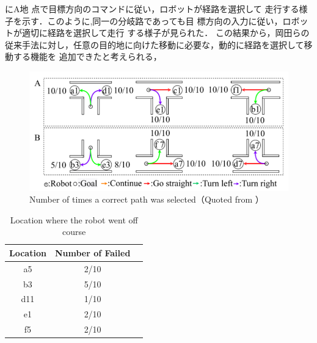 にA地
点で目標方向のコマンドに従い，ロボットが経路を選択して
走行する様子を示す．このように,同一の分岐路であっても目
標方向の入力に従い，ロボットが適切に経路を選択して走行
する様子が見られた．
この結果から，岡田らの従来手法に対し，任意の目的地に向けた移動に必要な，動的に経路を選択して移動する機能を
追加できたと考えられる，
\begin{figure}[htbp]
    \centering
     \includegraphics[width=130mm]{images/pdf/haru_mech_res.pdf}
     \caption[Number of times a correct path was selected]{Number of times a correct path was selected（Quoted from \cite{haruyama2022}）}
     \label{fig:haru_mech_ab_res}
\end{figure}
\vspace{-1zh}
\begin{table}[htbp]
    \centering
    \caption{Location where the robot went off course}\label{tab:path_res}
    \begin{tabular}{|c|c|c|}
    \hline
    Location & Number of Failed        \\
    \hline
    a5   & 2/10 \\
    b3   & 5/10 \\
    d11   & 1/10 \\
    e1  &  2/10 \\
    f5    & 2/10 \\
    \hline
    \end{tabular}
    \end{table}
